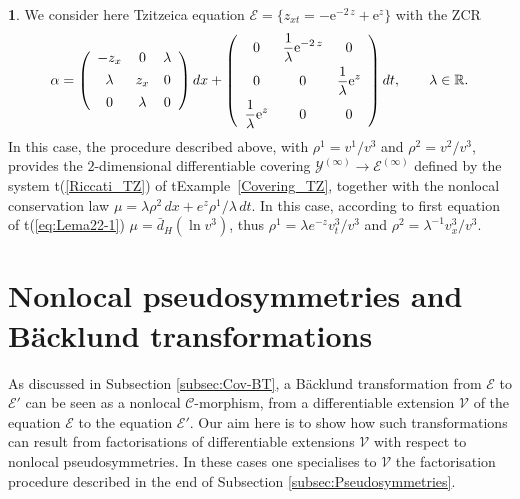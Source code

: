 \documentclass[12pt,english]{elsarticle}
\theoremstyle{plain}
\theoremstyle{plain}
\theoremstyle{remark}
\theoremstyle{plain}
\theoremstyle{definition}
\theoremstyle{definition}
\newtheorem{example}[thm]{\protect\examplename}
\providecommand{\examplename}{Example}
\begin{document}
\begin{example}
\label{exa:Tzitzeica1}%
We consider here Tzitzeica equation
$\mathcal{E}=\{z_{xt}=-{{\mathrm{e}}^{-2\,z}}+{{\mathrm{e}}^{z}}\}$ with the ZCR
%
\begin{equation*}
\alpha =\left (
%
\begin{array}{c@{\quad}c@{\quad}c}
-z_{x} & 0 & \lambda
\\
\noalign{\vspace{4pt}}
\lambda & z_{x} & 0
\\
\noalign{\vspace{4pt}}
0 & \lambda & 0
\end{array}
%
\right )dx+\left (
%
\begin{array}{c@{\quad}c@{\quad}c}
0 & {\displaystyle \frac{1}{\lambda}{{\mathrm{e}}^{-2\,z}}} & 0
\\
\noalign{\vspace{4pt}}
0 & 0 & {\displaystyle \frac{1}{\lambda}{{\mathrm{e}}^{z}}}
\\
\noalign{\vspace{4pt}}
{\displaystyle \frac{1}{\lambda}{{\mathrm{e}}^{z}}} & 0 & 0
\end{array}
%
\right )dt,\qquad \lambda \in \mathbb{R}.
\end{equation*}
%
In this case, the procedure described above, with
$\rho ^{1}=v^{1}/v^{3}$ and $\rho ^{2}=v^{2}/v^{3}$, provides the
$2$-dimensional differentiable covering
$\mathcal{Y}^{(\infty )}\rightarrow \mathcal{E}^{(\infty )}$ defined by
the system t{(\ref{Riccati_TZ})} of t{Example~\ref{Covering_TZ}}, together with
the nonlocal conservation law
$\mu =\lambda{\rho ^{2}}\,dx+e^{z}{\rho ^{1}/\lambda}\,dt$.
In this case, according to first equation of t{(\ref{eq:Lema22-1})}
$\mu =\bar{d}_{H}(\ln v^{3})$, thus
$\rho ^{1}=\lambda e^{-z}v_{t}^{3}/v^{3}$ and
$\rho ^{2}=\lambda ^{-1}v_{x}^{3}/v^{3}$.
\end{example}



\section{Nonlocal pseudosymmetries and B\"acklund transformations}
\label{sec:last}



As discussed in Subsection \ref{subsec:Cov-BT}, a B\"{a}cklund transformation
from $\mathcal{E}$ to $\mathcal{E}'$ can be seen as a nonlocal
$\mathcal{C}$-morphism, from a differentiable extension
$\mathcal{V}$ of the equation $\mathcal{E}$ to the equation
$\mathcal{E}'$. Our aim here is to show how such transformations can result
from factorisations of differentiable extensions $\mathcal{V}$ with respect
to nonlocal pseudosymmetries. In these cases one specialises to
$\mathcal{V}$ the factorisation procedure described in the end of Subsection \ref{subsec:Pseudosymmetries}.
\end{document}
